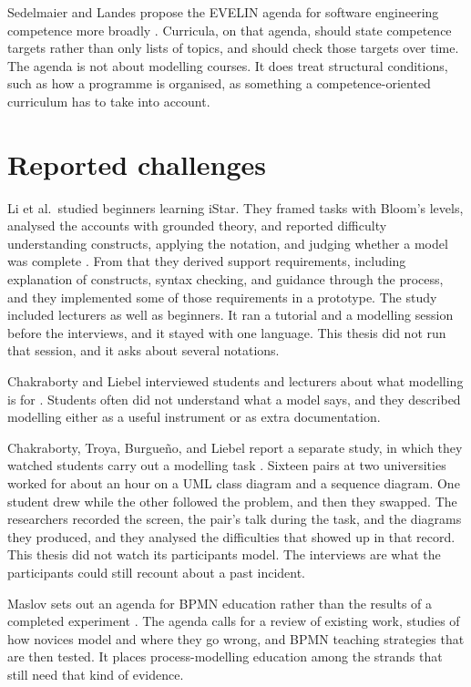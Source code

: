 Sedelmaier and Landes propose the EVELIN agenda for software engineering competence more broadly \cite{sedelmaier2013research}. Curricula, on that agenda, should state competence targets rather than only lists of topics, and should check those targets over time. The agenda is not about modelling courses. It does treat structural conditions, such as how a programme is organised, as something a competence-oriented curriculum has to take into account.

\section{Reported challenges}
\label{sec:rw_empirical}

Li et al.\ studied beginners learning iStar. They framed tasks with Bloom's levels, analysed the accounts with grounded theory, and reported difficulty understanding constructs, applying the notation, and judging whether a model was complete \cite{istar-learning}. From that they derived support requirements, including explanation of constructs, syntax checking, and guidance through the process, and they implemented some of those requirements in a prototype. The study included lecturers as well as beginners. It ran a tutorial and a modelling session before the interviews, and it stayed with one language. This thesis did not run that session, and it asks about several notations.

Chakraborty and Liebel interviewed students and lecturers about what modelling is for \cite{chakraborty2022perceptions}. Students often did not understand what a model says, and they described modelling either as a useful instrument or as extra documentation.

Chakraborty, Troya, Burgue{\~n}o, and Liebel report a separate study, in which they watched students carry out a modelling task \cite{chakraborty2026actions}. Sixteen pairs at two universities worked for about an hour on a UML class diagram and a sequence diagram. One student drew while the other followed the problem, and then they swapped. The researchers recorded the screen, the pair's talk during the task, and the diagrams they produced, and they analysed the difficulties that showed up in that record. This thesis did not watch its participants model. The interviews are what the participants could still recount about a past incident.

Maslov sets out an agenda for BPMN education rather than the results of a completed experiment \cite{bpmn-education}. The agenda calls for a review of existing work, studies of how novices model and where they go wrong, and BPMN teaching strategies that are then tested. It places process-modelling education among the strands that still need that kind of evidence.


